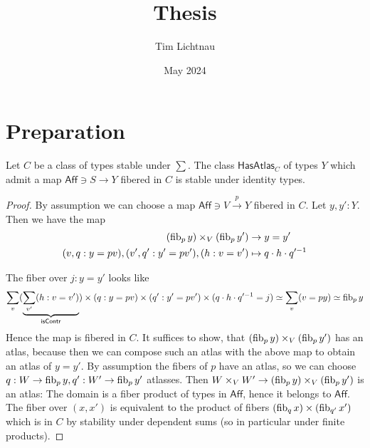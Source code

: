 \documentclass{article}
\title{Thesis}
\author{Tim Lichtnau }
\date{May 2024}
\newcommand{\Aff}{\mathsf{Aff}}
\begin{document}
\newtheorem*{warning}{Warning}
\newtheorem*{why}{Why I did it this way}
\newtheorem*{think}{Think about}
\maketitle


\section{Preparation}


\begin{lemma}{\label{lemma:havingAbstractAtlasClosedUnderId}}
	Let $C$ be a class of types stable under $\sum$. %
	The class $\mathsf{HasAtlas}_C$ of types $Y$ which admit a map $\Aff \ni S \to Y$ fibered in $C$ is stable under identity types. %
\end{lemma}
\begin{proof}
	
	By assumption we can choose a map $\Aff \ni V \overset{p}{\to} Y$ fibered in $C$. Let $y,y' : Y$.  Then we have the map
	\begin{align*}
		(\operatorname{fib}_p y) \times_V (\operatorname{fib}_p y') &\to y = y' \\
		(v , q : y = p v) , (v', q' : y' = p v') , (h : v = v') &\mapsto q \cdot h \cdot q'^{-1}
	\end{align*}
	
	The fiber over $j : y = y'$ looks like  %
	\[
	\sum_{v}  ( \underbrace{\sum_{v'} (h : v = v')}_{\mathsf{isContr}}) \times (q : y = p v) \times (q'  : y' = p v') \times (q \cdot h \cdot q'^{-1} = j) \simeq \sum_v (v = py) \simeq \operatorname{fib}_p y
	\]
	Hence the map is fibered in $C$. It suffices to show, that	$(\operatorname{fib}_p y) \times_V (\operatorname{fib}_p y')$ has an atlas, because then we can compose such an atlas with the above map to obtain an atlas of $y = y'$.
	By assumption the fibers of $p$ have an atlas, so we can choose $q : W \to \operatorname{fib}_p y, q' : W' \to \operatorname{fib}_p y'$ atlasses. Then $W \times_V W' \to (\operatorname{fib}_p y) \times_V (\operatorname{fib}_p y')$ is an atlas: The domain is a fiber product of types in $\Aff$, hence it belongs to $\Aff$. The fiber over $(x,x')$ is equivalent to the product of fibers $(\operatorname{fib}_q x) \times (\operatorname{fib}_{q'} x')$ which is in $C$ by stability under dependent sums (so in particular under finite products).
	
\end{proof}
\end{document}
